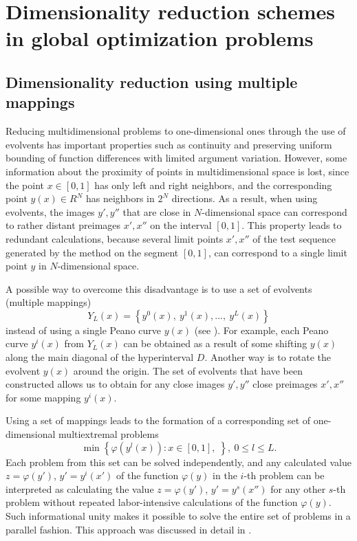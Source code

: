 \documentclass{svproc}
\begin{document}
\section{Dimensionality reduction schemes in global optimization problems}

\subsection{Dimensionality reduction using multiple mappings}

Reducing multidimensional problems to one-dimensional ones through the use of evolvents has important properties such as continuity and preserving uniform bounding of function differences with limited argument variation. However, some information about the proximity of points in multidimensional space is lost, since the point \(x\in [0,1]\) has only left and right neighbors, and the corresponding point \(y(x) \in R^N\) has neighbors in \(2^N\) directions. As a result, when using evolvents, the images \(y' , y''\) that are close in \(N\)-dimensional space can correspond to rather distant preimages \(x' , x''\) on the interval \([0,1]\). This property leads to redundant calculations, because several limit points \(x' , x''\) of the test sequence generated by the method on the segment \([0,1]\), can correspond to a single limit point \(y\) in \(N\)-dimensional space.

A possible way to overcome this disadvantage is to use a set of evolvents (multiple mappings)
\begin{displaymath}
\label{eq:142}
Y_L(x)=\left\{y^0(x),\ y^1(x),...,\ y^L(x)\right\}
\end{displaymath}
instead of using a single Peano curve \(y(x)\) (see \cite{Strongin1992,Strongin2000}). For example, each Peano curve \(y^i(x)\) from \(Y_L(x)\) can be obtained as a result of some shifting \(y(x)\) along the main diagonal of the hyperinterval \(D\). Another way is to rotate the evolvent \(y(x)\) around the origin. The set of evolvents that have been constructed allows us to obtain for any close images \(y', y''\) close preimages \(x', x''\) for some mapping \(y^i(x)\).

Using a set of mappings leads to the formation of a corresponding set of one-dimensional multiextremal problems
\begin{displaymath}
\label{6_problem_l}
\min{\left\{\varphi(y^l(x)):x\in [0,1], \;  \right\}}, \ 0 \leqslant l \leqslant L.
\end{displaymath}
Each problem from this set can be solved independently, and any calculated value \(z= \varphi(y')\), \(y'=y^i(x')\) of the function \(\varphi(y)\) in the \(i\)-th problem can be interpreted as calculating the value \(z= \varphi(y')\), \(y'=y^s(x'')\) for any other \(s\)-th problem without repeated labor-intensive calculations of the function \(\varphi(y)\). Such informational unity makes it possible to solve the entire set of problems in a parallel fashion. This approach was discussed in detail in \cite{Barkalov2019}.
\end{document}

